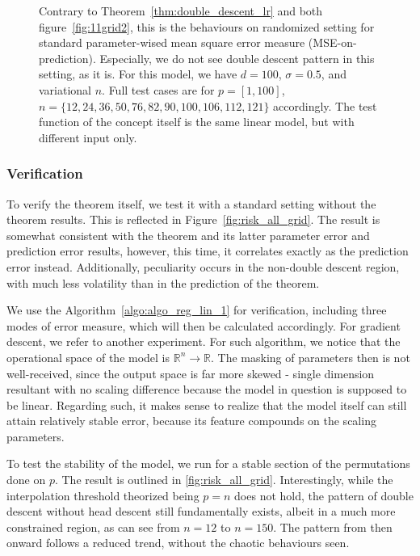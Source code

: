 \documentclass[twoside,10pt]{article}
\begin{document}
\begin{figure}[htb]
  \caption{Contrary to Theorem~\ref{thm:double_descent_lr} and both figure~\ref{fig:11grid2}, this is the behaviours on randomized setting for standard parameter-wised mean square error measure (MSE-on-prediction). Especially, we do not see double descent pattern in this setting, as it is. For this model, we have $d=100$, $\sigma = 0.5$, and variational $n$. Full test cases are for $p=[1,100]$, $n=\{12,24,36,50,76,82,90,100,106,112,121\}$ accordingly. The test function of the concept itself is the same linear model, but with different input only.}
  \label{fig:11grid21}
\end{figure}

\clearpage 

\subsubsection{Verification}

To verify the theorem itself, we test it with a standard setting without the theorem results. This is reflected in Figure~\ref{fig:risk_all_grid}. The result is somewhat consistent with the theorem and its latter parameter error and prediction error results, however, this time, it correlates exactly as the prediction error instead. Additionally, peculiarity occurs in the non-double descent region, with much less volatility than in the prediction of the theorem. 

We use the Algorithm~\ref{algo:algo_reg_lin_1} for verification, including three modes of error measure, which will then be calculated accordingly. For gradient descent, we refer to another experiment. For such algorithm, we notice that the operational space of the model is $\mathbb{R}^{n}\to \mathbb{R}$. The masking of parameters then is not well-received, since the output space is far more skewed - single dimension resultant with no scaling difference because the model in question is supposed to be linear. Regarding such, it makes sense to realize that the model itself can still attain relatively stable error, because its feature compounds on the scaling parameters.  

To test the stability of the model, we run for a stable section of the permutations done on $p$. The result is outlined in \ref{fig:risk_all_grid}. Interestingly, while the interpolation threshold theorized being $p=n$ does not hold, the pattern of double descent without head descent still fundamentally exists, albeit in a much more constrained region, as can see from $n=12$ to $n=150$. The pattern from then onward follows a reduced trend, without the chaotic behaviours seen. 
\end{document}
